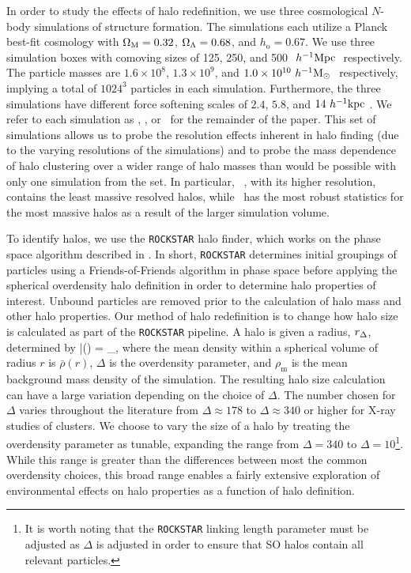 \documentclass[usenatbib]{mnras}
\begin{document}
In order to study the effects of halo redefinition, we use three cosmological $N$-body simulations of structure
formation. The \citet{diemer_kravtsov15} simulations each utilize a Planck best-fit cosmology with $\Omega_{\mathrm{M}} = 0.32$, $\Omega_{\Lambda} =
0.68$, and $h_{\mathrm{o}} = 0.67$. We use three simulation boxes with comoving sizes of 125, 250, and 500
$\ h^{-1}\mathrm{Mpc}~$ respectively. The particle masses are $1.6 \times 10^8$, $1.3 \times 10^9$, and $1.0 \times 10^{10}
\ h^{-1}\mathrm{M}_{\odot}~$ respectively, implying a total of $1024^3$ particles in each simulation. Furthermore, the three
simulations have different force softening scales of $2.4$, $5.8$, and $14 \ h^{-1}\mathrm{kpc}~$. We refer to each simulation as
\simA, \simB, or \simC  \ for the remainder of the paper. This set of simulations allows us to probe the
resolution effects inherent in halo finding (due to the varying resolutions of the simulations) and to probe the
mass dependence of halo clustering over a wider range of halo masses than would be possible with only one
simulation from the set. In particular, \simA~, with its higher resolution, contains the least massive resolved
halos, while \simC~has the most robust statistics for the most massive halos as a result of the larger simulation
volume.

To identify halos, we use the {\tt ROCKSTAR} halo finder, which works on the phase space algorithm described in
\citet*{behroozi_etal13a}. In short, {\tt ROCKSTAR} determines initial groupings of particles using a Friends-of-Friends algorithm 
in phase space before applying the spherical overdensity halo definition in order to determine halo properties of
interest. Unbound particles are removed prior to the calculation of halo mass and other halo properties. Our
method of halo redefinition is to change how halo size is calculated as part of the {\tt ROCKSTAR} pipeline. A halo is
given a radius, $r_{\Delta}$, determined by
\beq
	\bar{\rho}(\Rdel) = \Delta \rho_{}, 
\eeq
where the mean density within a spherical volume of radius $r$ is $\bar{\rho}(r)$, $\Delta$ is the overdensity
parameter, and $\rho_{\mathrm{m}}$ is the mean background mass density of the simulation. The resulting
halo size calculation can have a large variation depending on the choice of $\Delta$. The number chosen for
$\Delta$ varies throughout the literature from $\Delta \approx 178$ to $\Delta \approx 340$ or higher for X-ray studies of 
clusters. We choose to vary the size of a halo by treating the overdensity parameter as tunable, expanding the range from 
$\Delta = 340$ to $\Delta = 10$\footnote{It is worth noting that the {\tt ROCKSTAR} linking length parameter must be adjusted 
as $\Delta$ is adjusted in order to ensure that SO halos contain all relevant particles.}. While this range is greater than the 
differences between most the common overdensity choices, this broad range enables a fairly extensive exploration of 
environmental effects on halo properties as a function of halo definition.
\end{document}
